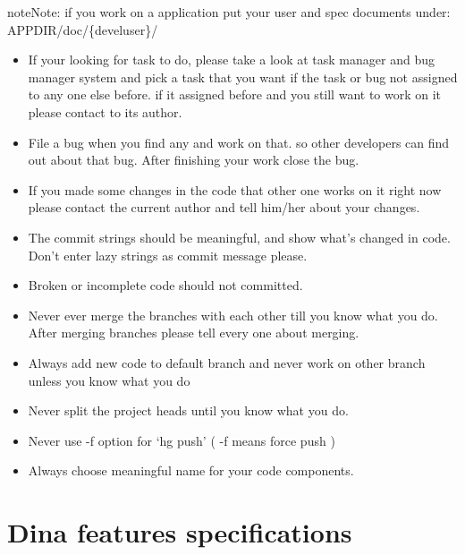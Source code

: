 \documentclass[letterpaper,10pt,english]{manual}
\begin{document}
\begin{notice}{note}{Note:}
if you work on a  application put your user and spec documents under: APPDIR/doc/\{devel\textbar{}user\}/
\end{notice}
\begin{itemize}
\item {} 
If your looking for task to do, please take a look at task manager and bug manager system and pick a task that you want if the task or bug not assigned to any one else before. if it assigned before and you still want to work on it please contact to its author.

\item {} 
File a bug when you find any and work on that. so other developers can find out about that bug. After finishing your work close the bug.

\item {} 
If you made some changes in the code that other one works on it right now please contact the current author and tell him/her about your changes.

\item {} 
The commit strings should be meaningful, and show what's changed in code. Don't enter lazy strings as commit message please.

\item {} 
Broken or incomplete code should not committed.

\item {} 
Never ever merge the branches with each other till you know what you do. After merging branches please tell every one about merging.

\item {} 
Always add new code to default branch and never work on other branch unless you know what you do

\item {} 
Never split the project heads until you know what you do.

\item {} 
Never use -f option for `hg push' ( -f means force push )

\item {} 
Always choose meaningful name for your code components.

\end{itemize}

\resetcurrentobjects
\hypertarget{--doc-devel/spec/index}{}

\section{Dina features specifications}
\end{document}
